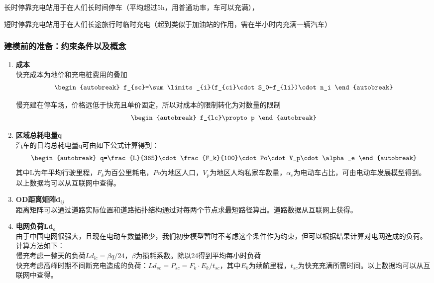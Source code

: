 \documentclass[12pt, a4paper, oneside]{ctexart}
\begin{document}
长时停靠充电站用于在人们长时间停车（平均超过5h，用普通功率，车可以充满），

短时停靠充电站用于在人们长途旅行时临时充电（起到类似于加油站的作用，需在半小时内充满一辆汽车）
\subsubsection{建模前的准备：约束条件以及概念}
\begin{enumerate}[label = \roman*)]
    \item \textbf{成本}\\
          快充成本为地价和充电桩费用的叠加
          \begin{align}\begin{autobreak}
                  f_{sc}=\sum\limits_{i}(f_{ci}\cdot S_0+f_{li})\cdot n_i
              \end{autobreak}\end{align}



          慢充建在停车场，价格远低于快充且单价固定，所以对成本的限制转化为对数量的限制
          \begin{align}\begin{autobreak}
                  f_{lc}\propto p
              \end{autobreak}\end{align}
    \item \textbf{区域总耗电量q}\\
          汽车的日均总耗电量q可由如下公式计算得到：
          \begin{align}\begin{autobreak}
                  q=\frac{L}{365}\cdot \frac{F_k}{100}\cdot Po\cdot V_p\cdot \alpha_e
              \end{autobreak}\end{align}
          其中L为年平均行驶里程，\(F_k\)为百公里耗电，\(Po\)为地区人口，\(V_p\)为地区人均私家车数量，\(\alpha_e\)为电动车占比，可由电动车发展模型得到。以上数据均可以从互联网中查得。
    \item \textbf{OD距离矩阵d\(_{ij}\)}\\
          距离矩阵可以通过道路实际位置和道路拓扑结构通过对每两个节点求最短路径算出。道路数据从互联网上获得。
    \item \textbf{电网负荷Ld\(_a\)}\\
          由于中国电网很强大，且现在电动车数量稀少，我们初步模型暂时不考虑这个条件作为约束，但可以根据结果计算对电网造成的负荷。计算方法如下：\\
          慢充考虑一整天的负荷\(Ld_{lc}=\beta q/24\)，\(\beta\)为损耗系数。除以24得到平均每小时负荷\\
          快充考虑高峰时期不间断充电造成的负荷：\(Ld_{sc}=P_{sc}=F_k\cdot E_k/t_{sc}\)，其中\(E_k\)为续航里程，\(t_{sc}\)为快充充满所需时间。以上数据均可以从互联网中查得。


\end{enumerate}
\end{document}
